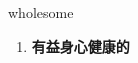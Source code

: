 
\begin{frame}
{\huge wholesome}
\begin{center}
\begin{enumerate}\Large
  \item \textbf{有益身心健康的}
\end{enumerate}
\end{center}
\end{frame}
